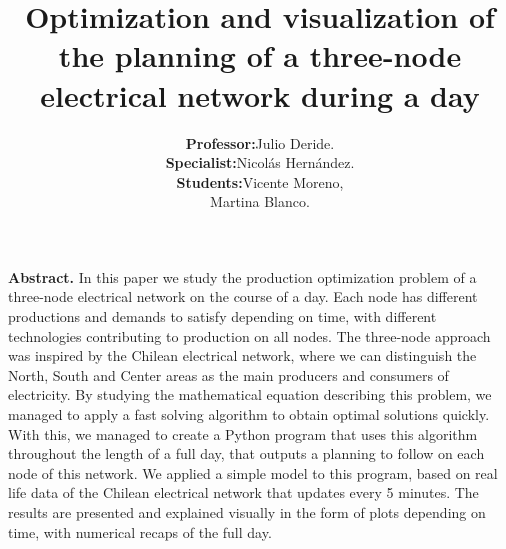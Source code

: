 \documentclass[12pt,twoside]{article}
\begin{document}
	\title{\textbf{Optimization and visualization of the planning of a three-node electrical network during a day}}
	\author{\begin{tabular}{rl}
			\textbf{Professor:} & Julio Deride.\\
			\textbf{Specialist:} & Nicol\'as Hern\'andez. \\
			\textbf{Students:} & Vicente Moreno, \\
			& Martina Blanco.
	\end{tabular}}
	\date{}
	\maketitle

	\textbf{Abstract.} In this paper we study the production optimization problem of a three-node electrical network on the course of a day. Each node has different productions and demands to satisfy depending on time, with different technologies contributing to production on all nodes. The three-node approach was inspired by the Chilean electrical network, where we can distinguish the North, South and Center areas as the main producers and consumers of electricity. By studying the mathematical equation describing this problem, we managed to apply a fast solving algorithm to obtain optimal solutions quickly. With this, we managed to create a Python program that uses this algorithm throughout the length of a full day, that outputs a planning to follow on each node of this network. We applied a simple model to this program, based on real life data of the Chilean electrical network that updates every 5 minutes. The results are presented and explained visually in the form of plots depending on time, with numerical recaps of the full day. 
\end{document}
